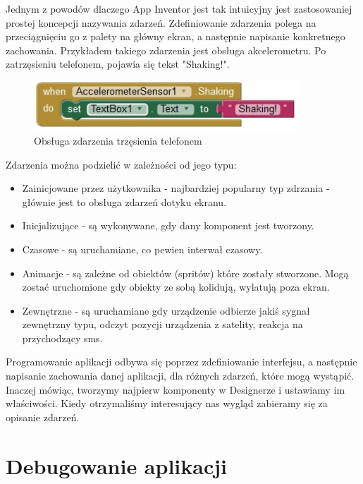 Jednym z powodów dlaczego App Inventor jest tak intuicyjny jest zastosowaniej prostej koncepcji nazywania zdarzeń. Zdefiniowanie zdarzenia polega na przeciągnięciu go z palety na główny ekran, a następnie napisanie konkretnego zachowania. Przykładem takiego zdarzenia jest obsługa akcelerometru. Po zatrzęsieniu telefonem, pojawia się tekst "Shaking!".

\begin{figure}[th] 
\centering\includegraphics[width=10cm]{figures/shakingEvent}
\caption{Obsługa zdarzenia trzęsienia telefonem}
\end{figure}

Zdarzenia można podzielić w zależności od jego typu:
\begin{itemize}
\item Zainicjowane przez użytkownika - najbardziej popularny typ zdrzania - głównie jest to obsługa zdarzeń dotyku ekranu.
\item Inicjalizujące - są wykonywane, gdy dany komponent jest tworzony.
\item Czasowe - są uruchamiane, co pewien interwał czasowy.
\item Animacje - są zależne od obiektów (spritów) które zostały stworzone. Mogą zostać uruchomione gdy obiekty ze sobą kolidują, wylatują poza ekran.
\item Zewnętrzne - są uruchamiane gdy urządzenie odbierze jakiś sygnał zewnętrzny typu, odczyt pozycji urządzenia z satelity, reakcja na przychodzący sms.
\end{itemize}

Programowanie aplikacji odbywa się poprzez zdefiniowanie interfejsu, a następnie napisanie zachowania danej aplikacji, dla różnych zdarzeń, które mogą wystąpić. Inaczej mówiąc, tworzymy najpierw komponenty w Designerze i ustawiamy im właściwości. Kiedy otrzymaliśmy interesujący nas wygląd zabieramy się za opisanie zdarzeń.

\section{Debugowanie aplikacji}
\label{c33}